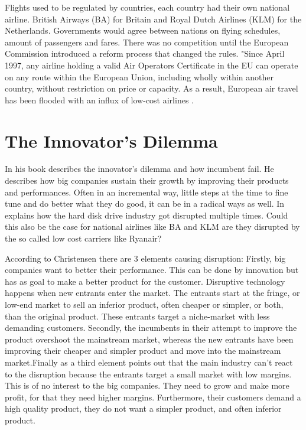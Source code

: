 \documentclass[a4paper, 11pt]{article}
\begin{document}
Flights used to be regulated by countries, each country had their own national airline. British Airways (BA) for Britain and Royal Dutch Airlines (KLM) for the Netherlands. Governments would agree between nations on flying schedules, amount of passengers and fares. There was no competition until the European Commission introduced a reform process that changed the rules. "Since April 1997, any airline holding a valid Air Operators Certificate in the EU can operate on any route within the European Union, including wholly within another country, without restriction on price or capacity. As a result, European air travel has been flooded with an influx of low-cost airlines \citep{Eurocontrol}.



\label{sec:this-is-a-section}

\section{The Innovator's Dilemma}


In his book \cite{Christensen97} describes the innovator's dilemma and how incumbent fail. He describes how big companies sustain their growth by improving their products and performances. Often in an incremental way, little steps at the time to fine tune and do better what they do good, it can be in a radical ways as well. In \citep{Christensen97} explains how the hard disk drive industry got disrupted multiple times. Could this also be the case for national airlines like BA and KLM are they disrupted by the so called low cost carriers like Ryanair?

According to Christensen \cite{Christensen97} there are 3 elements causing disruption: Firstly, big companies want to better their performance. This can be done by innovation but has as goal to make a better product for the customer. Disruptive technology happens when new entrants enter the market. The entrants start at the fringe, or low-end market to sell an inferior product, often cheaper or simpler, or both, than the original product. These entrants target a niche-market with less demanding customers. Secondly, the incumbents in their attempt to improve the product overshoot the mainstream market, whereas the new entrants have been improving their cheaper and simpler product and move into the mainstream market.Finally as a third element \cite{Christensen97} points out that the main industry can't react to the disruption because the entrants target a small market with low margins. This is of no interest to the big companies. They need to grow and make more profit, for that they need higher margins. Furthermore, their customers demand a high quality product, they do not want a simpler product, and often inferior product.
\end{document}
